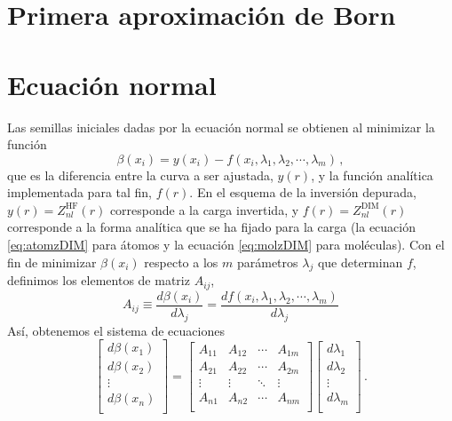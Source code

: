 \appendix

\chapter{Primera aproximación de Born}
\label{app:born}

\chapter{Ecuación normal}
\label{app:ecnormal}

Las semillas iniciales dadas por la ecuación normal se obtienen al 
minimizar la función
\begin{equation}
 \beta(x_i) = y(x_i) - f(x_i,\lambda_1,\lambda_2,\cdots,\lambda_m)\,,
\end{equation}
que es la diferencia entre la curva a ser ajustada, $y(r)$, y la función
analítica implementada para tal fin, $f(r)$. En el esquema de la inversión
depurada, $y(r) = Z_{nl}^{\mathrm{HF}}(r)$ corresponde a la carga invertida,
y $f(r) = Z_{nl}^{\mathrm{DIM}}(r)$ corresponde a la forma analítica que 
se ha fijado para la carga (la ecuación \ref{eq:atomzDIM} para átomos y 
la ecuación \ref{eq:molzDIM} para moléculas). Con el fin de minimizar
$\beta(x_i)$ respecto a los $m$ parámetros $\lambda_j$ que determinan 
$f$, definimos los elementos de matriz $A_{ij}$,
\begin{equation}
  A_{ij} \equiv \frac{d\beta(x_i)}{d\lambda_j} =
 \frac{df(x_i,\lambda_1,\lambda_2,\cdots, \lambda_m)}{d\lambda_j}
\end{equation}
Así, obtenemos el sistema de ecuaciones
\begin{equation}
 \left[
 \begin{array}{c}
  d\beta(x_1) \\
  d\beta(x_2) \\
  \vdots \\
  d\beta(x_n) \\
 \end{array}
 \right] =
 \left[
 \begin{array}{cccc}
  A_{11} & A_{12} & \cdots & A_{1m} \\
  A_{21} & A_{22} & \cdots & A_{2m} \\
  \vdots & \vdots & \ddots & \vdots \\
  A_{n1} & A_{n2} & \cdots & A_{nm} \\
 \end{array}
 \right]
 \left[
 \begin{array}{c}
 d\lambda_1 \\
 d\lambda_2 \\
 \vdots \\
 d\lambda_m \\
 \end{array}
 \right] \,.
\end{equation}
